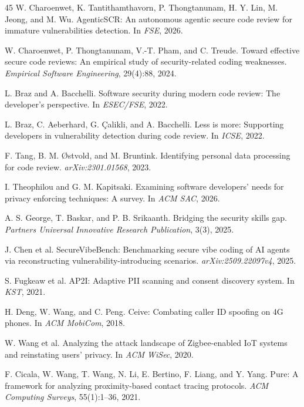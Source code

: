 \documentclass[runningheads]{llncs}
\begin{document}
\begin{thebibliography}{45}
 W. Charoenwet, K. Tantithamthavorn, P. Thongtanunam, H. Y. Lin, M. Jeong, and M. Wu. AgenticSCR: An autonomous agentic secure code review for immature vulnerabilities detection. In \emph{FSE}, 2026.

 W. Charoenwet, P. Thongtanunam, V.-T. Pham, and C. Treude. Toward effective secure code reviews: An empirical study of security-related coding weaknesses. \emph{Empirical Software Engineering}, 29(4):88, 2024.

 L. Braz and A. Bacchelli. Software security during modern code review: The developer's perspective. In \emph{ESEC/FSE}, 2022.

 L. Braz, C. Aeberhard, G. \c{C}alikli, and A. Bacchelli. Less is more: Supporting developers in vulnerability detection during code review. In \emph{ICSE}, 2022.

 F. Tang, B. M. {\O}stvold, and M. Bruntink. Identifying personal data processing for code review. \emph{arXiv:2301.01568}, 2023.

 I. Theophilou and G. M. Kapitsaki. Examining software developers' needs for privacy enforcing techniques: A survey. In \emph{ACM SAC}, 2026.

 A. S. George, T. Baskar, and P. B. Srikaanth. Bridging the security skills gap. \emph{Partners Universal Innovative Research Publication}, 3(3), 2025.

 J. Chen et al. SecureVibeBench: Benchmarking secure vibe coding of AI agents via reconstructing vulnerability-introducing scenarios. \emph{arXiv:2509.22097v4}, 2025.

 S. Fugkeaw et al. AP2I: Adaptive PII scanning and consent discovery system. In \emph{KST}, 2021.

 H. Deng, W. Wang, and C. Peng. Ceive: Combating caller ID spoofing on 4G phones. In \emph{ACM MobiCom}, 2018.

 W. Wang et al. Analyzing the attack landscape of Zigbee-enabled IoT systems and reinstating users' privacy. In \emph{ACM WiSec}, 2020.

 F. Cicala, W. Wang, T. Wang, N. Li, E. Bertino, F. Liang, and Y. Yang. Pure: A framework for analyzing proximity-based contact tracing protocols. \emph{ACM Computing Surveys}, 55(1):1--36, 2021.


\end{thebibliography}
\end{document}
